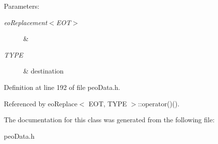 \begin{Desc}
\item[Parameters:]
\begin{description}
\item[{\em eo\-Replacement$<$EOT$>$}]\& \item[{\em TYPE}]\& destination \end{description}
\end{Desc}


Definition at line 192 of file peo\-Data.h.

Referenced by eo\-Replace$<$ EOT, TYPE $>$::operator()().

The documentation for this class was generated from the following file:\begin{CompactItemize}
\item 
peo\-Data.h\end{CompactItemize}
